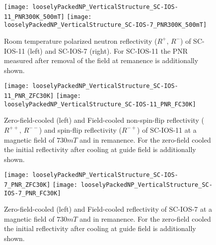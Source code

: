 \documentclass[\main/dresen_thesis.tex]{subfiles}
\begin{document}
  \label{sec:looselyPackedNS:layers:pnr}
  \begin{figure}[tb]
    \centering
    \texttt{[image: looselyPackedNP\_VerticalStructure\_SC-IOS-11\_PNR300K\_500mT]}
    \texttt{[image: looselyPackedNP\_VerticalStructure\_SC-IOS-7\_PNR300K\_500mT]}
    \caption{\label{fig:looselyPackedNP:layer:pnrRoomTemperatureMagnetic}Room temperature polarized neutron reflectivity ($R^{+},\, R^{-}$) of SC-IOS-11 (left) and SC-IOS-7 (right). For SC-IOS-11 the PNR measured after removal of the field at remanence is additionally shown.}
  \end{figure}
  

  \begin{figure}[tb]
    \centering
    \texttt{[image: looselyPackedNP\_VerticalStructure\_SC-IOS-11\_PNR\_ZFC30K]}
    \texttt{[image: looselyPackedNP\_VerticalStructure\_SC-IOS-11\_PNR\_FC30K]}
    \caption{\label{fig:looselyPackedNP:layer:pnrZFCFCIOS11}Zero-field-cooled (left) and Field-cooled non-spin-flip reflectivity ($R^{++},\,R^{--}$) and spin-flip reflectivity ($R^{-+}$) of SC-IOS-11 at a magnetic field of $730 \unit{mT}$ and in remanence. For the zero-field cooled the initial reflectivity after cooling at guide field is additionally shown.}
  \end{figure}

  \begin{figure}[tb]
    \centering
    \texttt{[image: looselyPackedNP\_VerticalStructure\_SC-IOS-7\_PNR\_ZFC30K]}
    \texttt{[image: looselyPackedNP\_VerticalStructure\_SC-IOS-7\_PNR\_FC30K]}
    \caption{\label{fig:looselyPackedNP:layer:ZFCFCIOS7}Zero-field-cooled (left) and Field-cooled reflectivity of SC-IOS-7 at a magnetic field of $730 \unit{mT}$ and in remanence. For the zero-field cooled the initial reflectivity after cooling at guide field is additionally shown.}
  \end{figure}
\end{document}
